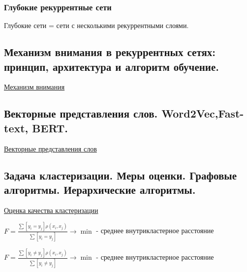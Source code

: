 \documentclass{article}
\begin{document}
\subsubsection{Глубокие рекуррентные сети}

Глубокие сети = сети с несколькими рекуррентными слоями.

\subsection{Механизм внимания в рекуррентных сетях: принцип, архитектура и алгоритм
обучение.}

\href{
	https://neerc.ifmo.ru/wiki/index.php?title=Механизм_внимания
}{Механизм внимания}


\subsection{Векторные представления слов. Word2Vec,Fast-text, BERT.}
\label{sec:word_embeddings}

\href{
	https://neerc.ifmo.ru/wiki/index.php?title=%
}{Векторные представления слов}



\subsection{Задача кластеризации. Меры оценки. Графовые алгоритмы. Иерархические
алгоритмы.}

\href{
	https://neerc.ifmo.ru/wiki/index.php?title=%
}{Оценка качества кластеризации}

$F = \frac{\sum [y_i = y_j] \rho(x_i, x_j)}{\sum [y_i = y_j]} \to \min$ - среднее внутрикластерное расстояние

$F = \frac{\sum [y_i \neq y_j] \rho(x_i, x_j)}{\sum [y_i \neq y_j]} \to \min$ - среднее внутрикластерное расстояние
\end{document}

